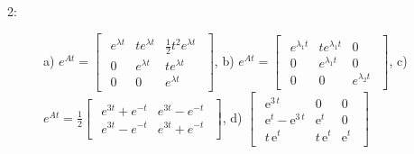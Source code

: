 \documentclass{article}
\begin{document}
\begin{description}
    \item [2:] a) $e^{At} = \begin{bmatrix}\begin{array}{rrr} e^{\lambda t} & t e^{\lambda t} & \frac{1}{2}t^{2} e^{\lambda t}\\ 0 & e^{\lambda t} & t e^{\lambda t}\\ 0 & 0 & e^{\lambda t} \end{array}\end{bmatrix}$,
    b) $e^{At} = \begin{bmatrix}\begin{array}{rrr} e^{\lambda_{1} t} & t e^{\lambda_{1} t} & 0\\ 0 & e^{\lambda_{1} t} & 0\\ 0 & 0 & e^{\lambda_{2} t} \end{array}\end{bmatrix}$,
    c)  $e^{At} = \frac{1}{2} \begin{bmatrix}\begin{array}{rr} e^{3t} + e^{-t} & e^{3t} - e^{-t}\\ e^{3t} - e^{-t} & e^{3t} + e^{-t} \end{array}\end{bmatrix}$,
    d)  $\begin{bmatrix}\begin{array}{rrr} {\mathrm{e}}^{3\,t} & 0 & 0\\ {\mathrm{e}}^t-{\mathrm{e}}^{3\,t} & {\mathrm{e}}^t & 0\\ t\,{\mathrm{e}}^t & t\,{\mathrm{e}}^t & {\mathrm{e}}^t \end{array}\end{bmatrix}$


\end{description}
\end{document}
